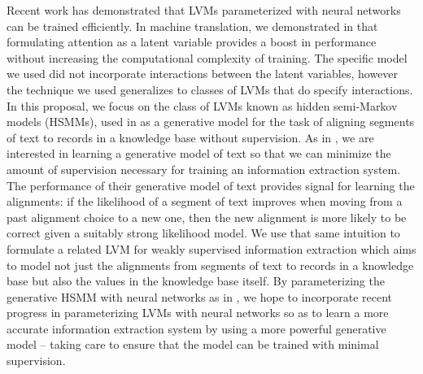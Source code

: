 \documentclass[11pt]{article}
\begin{document}
Recent work has demonstrated that LVMs parameterized with neural networks can be trained efficiently.
In machine translation, we demonstrated in \citet{deng2018attn} that formulating attention as
a latent variable provides a boost in performance without increasing the computational complexity of training.
The specific model we used did not incorporate interactions between the latent variables,
however the technique we used generalizes to classes of LVMs that do specify interactions.
In this proposal, we focus on the class of LVMs known as hidden semi-Markov models (HSMMs),
used in \citet{liang2009semalign} as a generative model for the task of aligning segments of text to
records in a knowledge base without supervision.
As in \citet{liang2009semalign}, we are interested in learning a generative model of text so that
we can minimize the amount of supervision necessary for training an information extraction system.
The performance of their generative model of text provides signal for learning the alignments:
if the likelihood of a segment of text improves when moving from a past alignment choice to a new one,
then the new alignment is more likely to be correct given a suitably strong likelihood model.
We use that same intuition to formulate a related LVM for weakly supervised information extraction
which aims to model not just the alignments from segments of text to records in a knowledge base
but also the values in the knowledge base itself.
By parameterizing the generative HSMM with neural networks as in \citet{wiseman2018template},
we hope to incorporate recent progress in parameterizing LVMs with neural networks
so as to learn a more accurate information extraction system by using a more powerful
generative model -- taking care to ensure that the model can be trained with minimal supervision.
\end{document}
